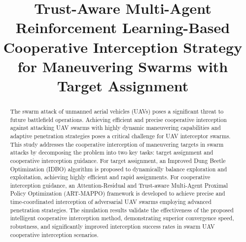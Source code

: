 \documentclass[lettersize,journal]{IEEEtran}
\begin{document}
\title{Trust-Aware Multi-Agent Reinforcement Learning-Based Cooperative Interception Strategy for Maneuvering Swarms with Target Assignment}



\author{}


\maketitle

\begin{abstract}
The swarm attack of unmanned aerial vehicles (UAVs) poses a significant threat to future
battlefield operations.
Achieving efficient and precise cooperative interception against attacking UAV swarms with
highly dynamic maneuvering capabilities and adaptive penetration strategies poses a critical
challenge for UAV interceptor swarms.
This study addresses the cooperative interception of maneuvering targets in swarm attacks by
decomposing the problem into two key tasks: target assignment and cooperative interception
guidance.
For target assignment, an Improved Dung Beetle Optimization (IDBO) algorithm is proposed to
dynamically balance exploration and exploitation, achieving highly efficient and rapid
assignments.
For cooperative interception guidance, an Attention-Residual and Trust-aware Multi-Agent Proximal Policy Optimization (ART-MAPPO) framework is developed to achieve precise and time-coordinated interception of adversarial UAV swarms employing advanced penetration strategies.
The simulation results validate the effectiveness of the proposed intelligent cooperative
interception method, demonstrating superior convergence speed, robustness, and significantly
improved interception success rates in swarm UAV cooperative interception scenarios.
\end{abstract}
\end{document}

